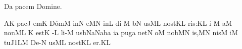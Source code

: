 
\beginhymn Da pacem Domine.


\gregorianFclef
{}
\nosolesmescustos
{}\Internote
\initiumgregorianum
{}%
\sgn {}A{}\bivirga K\egn
\spatium
\sgn p{a}c\punctum J\egn
\sgn {}em\punctum K\egn
\spatium
\sgn D{\'o}m\punctum M\egn
\sgn {}in\punctum N\egn
\sgn {}e{}\punctum M\augmentum N\egn
\spatium
\divisiominima
\spatium
\sgn {}in\punctum L\egn
\spatium
\sgn di-\punctum M\egn
{}b\punctum N\egn
\sgn {}us\clivis ML\egn
\spatium
\sgn n{o}{st}\punctum K\augmentum L\egn
\sgn ri{s:}\punctum K\augmentum L\egn
\spatium
\divisiominor
\spatium
{}i-\punctum M\egn
\sgn {}a{}\punctum M\egn
\spatium
\sgn non\clivis ML\egn
\spatium
\custos K
\lineaproxima
\sgn {}e{st}\punctum K\egn
\spatium
{}-\punctum L\egn
\sgn li-\punctum M\egn
\sgn {}us\bmolle b\torculus NaN\torculus aba\egn
\spatium
\divisiominima
\spatium
{}i{}\punctum a\egn
\spatium
\sgn p{u}g\punctum a\egn
\sgn net\punctum N\egn
\spatium
{}o{}\punctum M\egn
\spatium
\sgn n{o}b\pes MN\egn
\sgn {}i{s,}\punctum M\augmentum N\egn
\spatium
\divisiominima
\spatium
\sgn nis\punctum M\egn
\sgn {}i{}\punctum M\egn
\spatium
\sgn tu{}\episem J1\pes LM\egn
\spatium
\sgn D{e}-\punctum N\egn
\sgn {}us\clivis ML\egn
\spatium
\sgn n{o}{st}\punctum K\augmentum L\egn
\sgn {}e{r.}\punctum K\augmentum L\egn
\spatium
\Finisgregoriana

\bigskip


